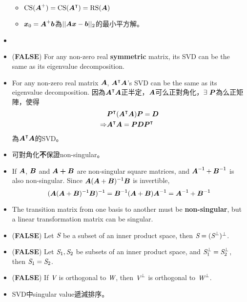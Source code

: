 \begin{itemize}
\begin{itemize}
		\item $\operatorname{CS}(\boldsymbol{A}^+) = \operatorname{CS}(\boldsymbol{A}^\intercal) = \operatorname{RS}(\boldsymbol{A})$
		\item $\boldsymbol{x}_0 = \boldsymbol{A}^+ \boldsymbol{b}$為$||\boldsymbol{A}\boldsymbol{x} - \boldsymbol{b}||_2$的最小平方解。
    \end{itemize}
    \item \item (\textbf{FALSE}) For any non-zero real \textbf{symmetric} matrix, its SVD can be the same as its eigenvalue decomposition.
    \item For any non-zero real matrix $\boldsymbol{A}$, $\boldsymbol{A}^\intercal\boldsymbol{A}$'s SVD can be the same as its eigenvalue decomposition. 
    因為$\boldsymbol{A}^\intercal\boldsymbol{A}$正半定，$\boldsymbol{A}$可么正對角化，$\exists \ \boldsymbol{P}$為么正矩陣，使得 \begin{equation}
        \begin{aligned}
            & \boldsymbol{P}^\intercal(\boldsymbol{A}^\intercal\boldsymbol{A})\boldsymbol{P} = \boldsymbol{D} \\
            \Rightarrow & \boldsymbol{A}^\intercal\boldsymbol{A} = \boldsymbol{P}\boldsymbol{D}\boldsymbol{P}^\intercal
        \end{aligned} 
    \end{equation} 為$\boldsymbol{A}^\intercal\boldsymbol{A}$的SVD。
    \item 可對角化\textbf{不}保證non-singular。
    \item If $\boldsymbol{A}$, $\boldsymbol{B}$ and $\boldsymbol{A + B}$ are non-singular square matrices, and $\boldsymbol{A}^{\mathsf{-1}} + \boldsymbol{B}^{\mathsf{-1}}$ is also non-singular.
    Since $\boldsymbol{A}(\boldsymbol{A} + \boldsymbol{B})^{\mathsf{-1}}\boldsymbol{B}$ is invertible, \begin{equation}
        (\boldsymbol{A}(\boldsymbol{A} + \boldsymbol{B})^{\mathsf{-1}}\boldsymbol{B})^{\mathsf{-1}} = \boldsymbol{B}^{\mathsf{-1}}(\boldsymbol{A} + \boldsymbol{B})\boldsymbol{A}^{\mathsf{-1}} = \boldsymbol{A}^{\mathsf{-1}} + \boldsymbol{B}^{\mathsf{-1}}
    \end{equation}
    \item The transition matrix from one basis to another must be \textbf{non-singular}, but a linear transformation matrix can be singular.
    \item (\textbf{FALSE}) Let $\textit{S}$ be a subset of an inner product space, then $\textit{S} = (\textit{S}^{\bot})^{\bot}$.
    \item (\textbf{FALSE}) Let $\textit{S}_1, \textit{S}_2$ be subsets of an inner product space, and $\textit{S}_1^{\bot} = \textit{S}_2^{\bot}$, then $\textit{S}_1 = \textit{S}_2$.
    \item (\textbf{FALSE}) If $\textit{V}$ is orthogonal to $\textit{W}$, then $\textit{V}^\bot$ is orthogonal to $\textit{W}^\bot$.
    \item SVD中singular value遞減排序。

\end{itemize}
